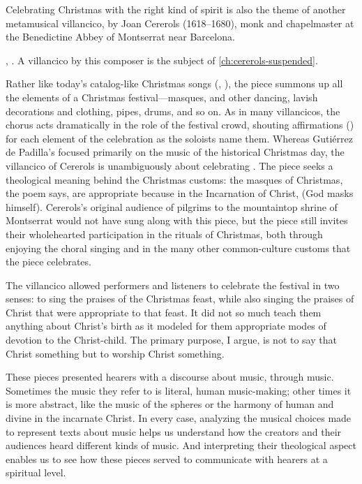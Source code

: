 Celebrating Christmas with the right kind of spirit is also the theme of
another metamusical villancico,  by Joan
Cererols (1618--1680), monk and chapelmaster at the Benedictine Abbey of
Montserrat near Barcelona.%
\begin{Footnote}
    , \autocite[81--94]{Cererols:MEM-VC}.
    A villancico by this composer is the subject of
    \cref{ch:cererols-suspended}.
\end{Footnote}
Rather like today's catalog-like Christmas songs (,
), the piece summons up all the
elements of a Christmas festival---masques,  and other
dancing, lavish decorations and clothing, pipes, drums, and so on.
As in many villancicos, the chorus acts dramatically in the role of the
festival crowd, shouting affirmations () for each element of
the celebration as the soloists name them.  
Whereas Gutiérrez de Padilla's  focused
primarily on the music of the historical Christmas day, the villancico of
Cererols is unambiguously about celebrating .
The piece seeks a theological meaning behind the Christmas customs: the masques
of Christmas, the poem says, are appropriate because in the Incarnation of
Christ,  (God masks himself).
Cererols's original audience of pilgrims to the mountaintop shrine of
Montserrat would not have sung along with this piece, but the piece still
invites their wholehearted participation in the rituals of Christmas, both
through enjoying the choral singing and in the many other common-culture
customs that the piece celebrates.

The villancico allowed performers and listeners to celebrate the festival in two
senses: to sing the praises of the Christmas feast, while also singing the
praises of Christ that were appropriate to that feast. 
It did not so much teach them anything about Christ's birth as it modeled for
them appropriate modes of devotion to the Christ-child.
The primary purpose, I argue, is not to say that Christ  something but
to worship Christ  something.

These pieces presented hearers with a discourse about music, through music.
Sometimes the music they refer to is literal, human music-making; other times
it is more abstract, like the music of the spheres or the harmony of human and
divine in the incarnate Christ.
In every case, analyzing the musical choices made to represent texts about
music helps us understand how the creators and their audiences heard different
kinds of music.
And interpreting their theological aspect enables us to see how these pieces
served to communicate with hearers at a spiritual level.

